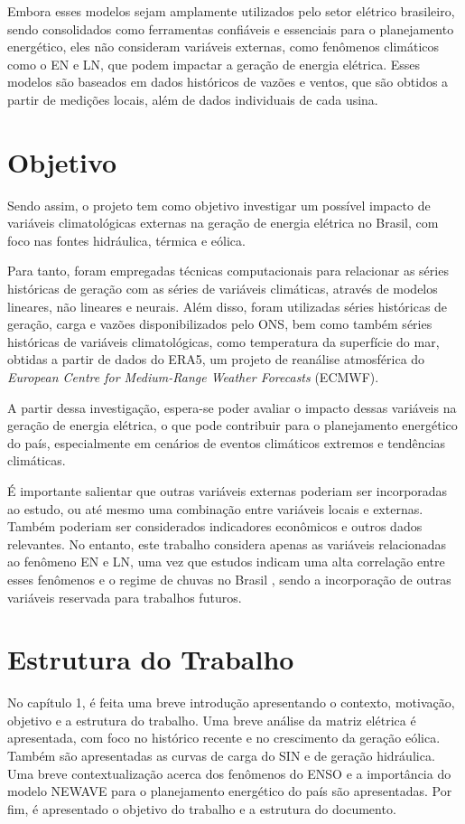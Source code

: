 Embora esses modelos sejam amplamente utilizados pelo setor elétrico brasileiro, sendo consolidados como ferramentas
confiáveis e essenciais para o planejamento energético, eles não consideram variáveis externas, como fenômenos climáticos
como o EN e LN, que podem impactar a geração de energia elétrica. Esses modelos são baseados em dados históricos de
vazões e ventos, que são obtidos a partir de medições locais, além de dados individuais de cada usina.

\section{Objetivo}
Sendo assim, o projeto tem como objetivo investigar um possível impacto de variáveis climatológicas externas na geração 
de energia elétrica no Brasil, com foco nas fontes hidráulica, térmica e eólica. 

Para tanto, foram empregadas técnicas computacionais para relacionar as séries históricas de geração com as séries de variáveis 
climáticas, através de modelos lineares, não lineares e neurais. Além disso, foram utilizadas séries históricas de geração, 
carga e vazões disponibilizados pelo ONS, bem como também séries históricas de variáveis climatológicas, como temperatura 
da superfície do mar, obtidas a partir de dados do ERA5, um projeto de reanálise atmosférica do \textit{European Centre for Medium-Range Weather Forecasts} (ECMWF).

A partir dessa investigação, espera-se poder avaliar o impacto dessas variáveis na geração de energia elétrica,
o que pode contribuir para o planejamento energético do país, especialmente em cenários de eventos climáticos extremos e
tendências climáticas.

É importante salientar que outras variáveis externas poderiam ser incorporadas ao estudo, ou até mesmo uma combinação entre
 variáveis locais e externas. Também poderiam ser considerados indicadores econômicos e outros dados relevantes. 
No entanto, este trabalho considera apenas as variáveis relacionadas ao fenômeno EN e LN, uma vez que estudos indicam
uma alta correlação entre esses fenômenos e o regime de chuvas no Brasil \cite{de2012influencia, Andreoli2016}, sendo a 
incorporação de outras variáveis reservada para trabalhos futuros.

\section{Estrutura do Trabalho}
No capítulo 1, é feita uma breve introdução apresentando o contexto, motivação, objetivo e a estrutura do trabalho. Uma
breve análise da matriz elétrica é apresentada, com foco no histórico recente e no crescimento da geração eólica. Também
são apresentadas as curvas de carga do SIN e de geração hidráulica. Uma breve contextualização acerca dos fenômenos do
ENSO e a importância do modelo NEWAVE para o planejamento energético do país são apresentadas. Por fim, é apresentado
o objetivo do trabalho e a estrutura do documento.

